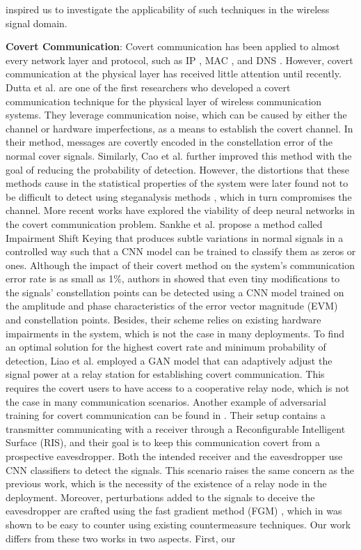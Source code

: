 inspired us to investigate the applicability of such techniques in the wireless signal domain.


\textbf{Covert Communication}: Covert communication has been applied to almost every network layer and protocol, such as IP \cite{cabuk2004ip}, MAC \cite{sheikholeslami2020covert}, and DNS \cite{nussbaum2009robust}. However, covert communication at the physical layer has received little attention until recently. Dutta et al. \cite{dutta2012secret} are one of the first researchers who developed a covert communication technique for the physical layer of wireless communication systems. They leverage communication noise, which can be caused by either the channel or hardware imperfections, as a means to establish the covert channel. In their method, messages are covertly encoded in the constellation error of the normal cover signals. Similarly, Cao et al. \cite{cao2018wireless} further improved this method with the goal of reducing the probability of detection. However, the distortions that these methods cause in the statistical properties of the system were later found not to be difficult to detect using steganalysis methods \cite{huang2020exploiting}, which in turn compromises the channel. More recent works have explored the viability of deep neural networks in the covert communication problem. Sankhe et al. \cite{sankhe2019impairment} propose a method called Impairment Shift Keying that produces subtle variations in normal signals in a controlled way such that a CNN model can be trained to classify them as zeros or ones. Although the impact of their covert method on the system's communication error rate is as small as 1\%, authors in \cite{huang2021detection} showed that even tiny modifications to the signals' constellation points can be detected using a CNN model trained on the amplitude and phase characteristics of the error vector magnitude (EVM) and constellation points. Besides, their scheme relies on existing hardware impairments in the system, which is not the case in many deployments. To find an optimal solution for the highest covert rate and minimum probability of detection, Liao et al. \cite{liao2020generative} employed a GAN model that can adaptively adjust the signal power at a relay station for establishing covert communication. This requires the covert users to have access to a cooperative relay node, which is not the case in many communication scenarios. Another example of adversarial training for covert communication can be found in \cite{kim2022covert}. Their setup contains a transmitter communicating with a receiver through a Reconfigurable Intelligent Surface (RIS), and their goal is to keep this communication covert from a prospective eavesdropper. Both the intended receiver and the eavesdropper use CNN classifiers to detect the signals. This scenario raises the same concern as the previous work, which is the necessity of the existence of a relay node in the deployment. Moreover, perturbations added to the signals to deceive the eavesdropper are crafted using the fast gradient method (FGM) \cite{goodfellow2014explaining}, which in \cite{bahramali2021robust} was shown to be easy to counter using existing countermeasure techniques. Our work differs from these two works in two aspects. First, our 